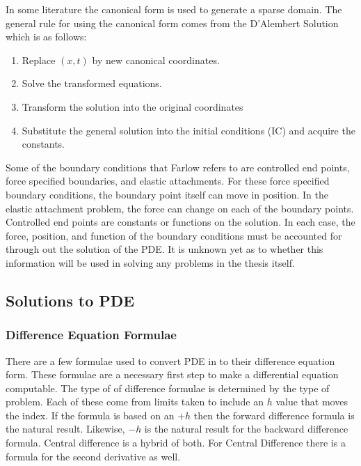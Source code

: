 
In some literature the canonical form is used to generate a sparse domain.  The general rule for using the canonical form comes from the D'Alembert Solution which is as follows:
\begin{enumerate}
\item Replace $(x,t)$ by new canonical coordinates.
\item Solve the transformed equations.
\item Transform the solution into the original coordinates
\item Substitute the general solution into the initial conditions (IC) and %
 acquire the constants. 
\end{enumerate}




 

Some of the boundary conditions that Farlow \cite{PDEfSE} refers to are controlled end points, force specified boundaries, and elastic attachments.  For these force specified boundary conditions, %
 the boundary point itself can move in position.  In the elastic attachment problem, the force can change on each of the boundary points.  %
Controlled end points are constants or functions on the solution.   
In each case, the force, position, and function of the boundary conditions must be accounted for through out the solution of the PDE.   It is unknown yet as to whether this information will be used in solving any problems in the thesis itself.  

\subsection {Solutions to PDE}

\subsubsection {Difference Equation Formulae}
There are a few formulae used to convert PDE in to their difference equation form.    These formulae are a necessary first step to make a differential equation computable.  The type of of difference formulae is determined by the type of problem.   Each of these come from limits taken to include an $h$ value that moves the index.  If the formula is based on an $+h$ then the forward difference formula is the natural result.  Likewise, $-h$ is the natural result for the backward difference formula.  Central difference is a hybrid of both.  For Central Difference there is a formula for the second derivative as well.  

